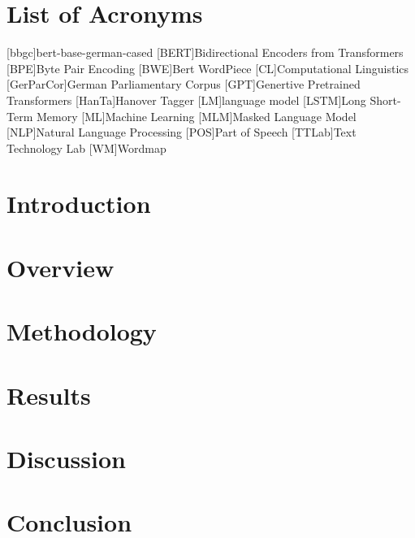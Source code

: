 \documentclass[12pt, a4paper, english]{ttlab-qualify}
\begin{document}
    \chapter*{List of Acronyms}
    \begin{acronym}
        [bbgc]{bert-base-german-cased}
        [BERT]{Bidirectional Encoders from Transformers}
        [BPE]{Byte Pair Encoding}
        [BWE]{Bert WordPiece}
        [CL]{Computational Linguistics}
        [GerParCor]{German Parliamentary Corpus}
        [GPT]{Genertive Pretrained Transformers}
        [HanTa]{Hanover Tagger}
        [LM]{language model}
        [LSTM]{Long Short-Term Memory}
        [ML]{Machine Learning}
        [MLM]{Masked Language Model}
        [NLP]{Natural Language Processing}
        [POS]{Part of Speech}
        [TTLab]{Text Technology Lab}
        [WM]{Wordmap}

    \end{acronym}

    \cleardoubleoddpage


    \chapter{Introduction}
    \setcounter{page}{1}
    \label{ch:introduction}
    

    \chapter{Overview}
    \label{ch:overview}
    


    \chapter{Methodology}
    \label{ch:methodology}
    


    \chapter{Results}
    \label{ch:results}
    


    \chapter{Discussion}
    \label{ch:discussion}

    \chapter{Conclusion}
    \label{ch:conclusion}


    \appendix
    \printbibliography
\end{document}
